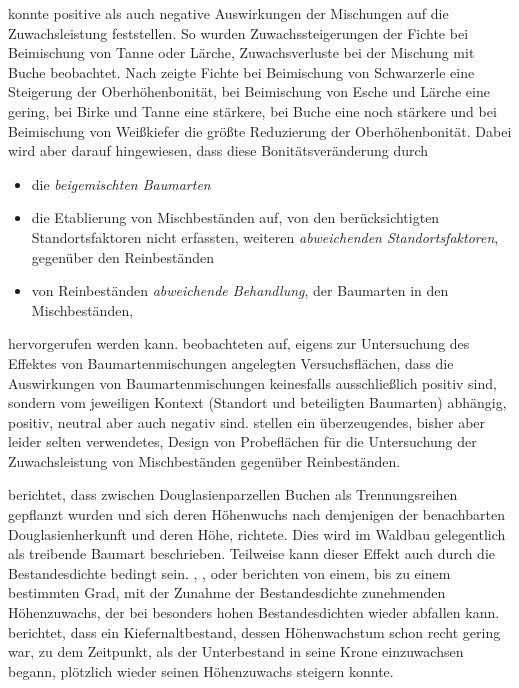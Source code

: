 \documentclass[twocolumn]{scrartcl}
\begin{document}
\cite{vospernik2021grundflaechenzuwachs} konnte positive als auch
negative Auswirkungen der Mischungen auf die Zuwachsleistung
feststellen. So wurden Zuwachssteigerungen der Fichte bei Beimischung
von Tanne oder Lärche, Zuwachsverluste bei der Mischung mit Buche
beobachtet. Nach \cite{kindermann2018siteIndex} zeigte Fichte bei
Beimischung von Schwarzerle eine Steigerung der Oberhöhenbonität, bei
Beimischung von Esche und Lärche eine gering, bei Birke und Tanne eine
stärkere, bei Buche eine noch stärkere und bei Beimischung von
Weißkiefer die größte Reduzierung der Oberhöhenbonität. Dabei wird
aber darauf hingewiesen, dass diese Bonitätsveränderung durch
\begin{itemize}
\item die \emph{beigemischten Baumarten}
\item die Etablierung von Mischbeständen auf, von den berücksichtigten
  Standortsfaktoren nicht erfassten, weiteren \emph{abweichenden
    Standortsfaktoren}, gegenüber den Reinbeständen
\item von Reinbeständen \emph{abweichende Behandlung}, der Baumarten
  in den Mischbeständen,
\end{itemize}
hervorgerufen werden kann. \cite{vanclay2022competitioninMixedSpecies}
beobachteten auf, eigens zur Untersuchung des Effektes von Baumartenmischungen
angelegten Versuchsflächen, dass die Auswirkungen von Baumartenmischungen
keinesfalls ausschließlich positiv sind, sondern vom jeweiligen Kontext
(Standort und beteiligten Baumarten) abhängig, positiv, neutral aber auch
negativ sind. \cite{vanclay2013mixedSpecies,vanclay2021ExperimentsMixedSpecies}
stellen ein überzeugendes, bisher aber leider selten verwendetes, Design von
Probeflächen für die Untersuchung der Zuwachsleistung von Mischbeständen gegenüber Reinbeständen.

\citet[S.~259]{muench1928KlimarassenDerDouglasie} berichtet, dass zwischen
Douglasienparzellen Buchen als Trennungsreihen gepflanzt wurden und sich deren
Höhenwuchs nach demjenigen der benachbarten Douglasienherkunft und deren Höhe,
richtete. Dies wird im Waldbau gelegentlich als treibende Baumart beschrieben.
Teilweise kann dieser Effekt auch durch die Bestandesdichte bedingt sein.
\cite{boehmerle1903BestandesdichteUndBestandeshoehe},
\cite{schmied1928UeberDenEinflussDerBestandesdichteAufDieBestandeshoeheInJuengerenBuchenbestaenden},
\citet[S.~75\,f.]{wiedemann1951Ertragskunde} oder
\citet[S.~46\,f.]{assmann1961Waldertraskunde} berichten von einem, bis zu einem
bestimmten Grad, mit der Zunahme der Bestandesdichte zunehmenden Höhenzuwachs,
der bei besonders hohen Bestandesdichten wieder abfallen kann.
\cite{zundel1960ErtragskundlicheUntersuchungenInZweialtrigenBestaendenNordwuerttembergs}
berichtet, dass ein Kiefernaltbestand, dessen Höhenwachstum schon
recht gering war, zu dem Zeitpunkt, als der Unterbestand in seine
Krone einzuwachsen begann, plötzlich wieder seinen Höhenzuwachs steigern
konnte.
\end{document}
